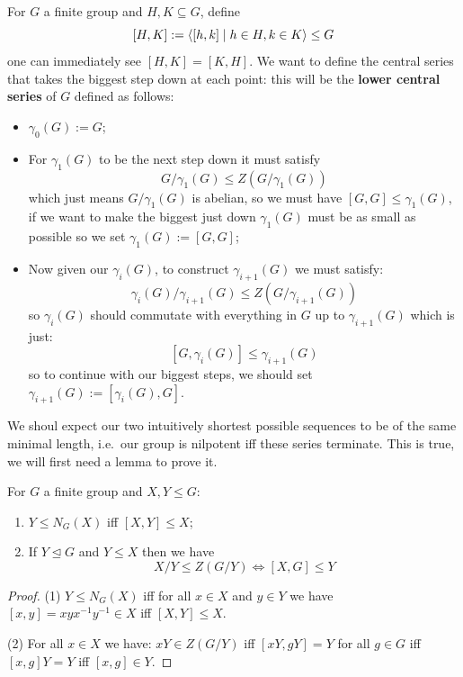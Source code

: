 \documentclass{article}
\begin{document}
\begin{definition}
    For $G$ a finite group and $H,K\subseteq G$, define \[
    [H,K] := \left\langle [h,k] \mid h\in H, k\in K \right\rangle\leq G
    \] one can immediately see $[H,K]=[K,H]$. We want to define the central series that takes the biggest step down at each point: this will be the \textbf{lower central series} of $G$ defined as follows:\begin{itemize}
        \item $\gamma_0(G) := G$;
        \item For $\gamma_1(G)$ to be the next step down it must satisfy \[
        G/\gamma_1(G) \leq Z(G/\gamma_1(G))
        \] which just means $G/\gamma_1(G)$ is abelian, so we must have $[G,G]\leq \gamma_1(G)$, if we want to make the biggest just down $\gamma_1(G)$ must be as small as possible so we set $\gamma_1(G):=[G,G]$;
        \item Now given our $\gamma_i(G)$, to construct $\gamma_{i+1}(G)$ we must satisfy: \[
            \gamma_i(G)/\gamma_{i+1}(G) \leq Z(G/\gamma_{i+1}(G))
        \] so $\gamma_i(G)$ should commutate with everything in $G$ up to $\gamma_{i+1}(G)$ which is just: \[
            [G,\gamma_i(G)]\leq \gamma_{i+1}(G)
        \] so to continue with our biggest steps, we should set $\gamma_{i+1}(G) := [\gamma_i(G),G]$.
    \end{itemize}
\end{definition}

We shoul expect our two intuitively shortest possible sequences to be of the same minimal length, i.e.~our group is nilpotent iff these series terminate. This is true, we will first need a lemma to prove it.

\begin{lemma}
    For $G$ a finite group and $X,Y\leq G$: \begin{enumerate}
        \item $Y\leq N_G(X)$ iff $[X,Y]\leq X$;
        \item If $Y\unlhd G$ and $Y\leq X$ then we have\[
            X/Y \leq Z(G/Y) \iff [X,G]\leq Y
        \]
    \end{enumerate}\begin{proof}
        (1) $Y\leq N_G(X)$ iff for all $x\in X$ and $y\in Y$ we have $[x,y]=xyx^{-1}y^{-1}\in X$ iff $[X,Y]\leq X$.

        (2) For all $x\in X$ we have: $xY\in Z(G/Y)$ iff $[xY,gY] = Y$ for all $g\in G$ iff $[x,g]Y=Y$ iff $[x,g]\in Y$.
    \end{proof}
\end{lemma}
\end{document}
